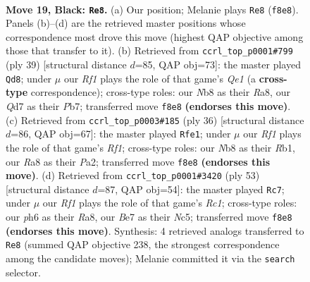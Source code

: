 \documentclass[11pt]{article}
\begin{document}
\begin{figure}[p]
\label{fig:thought-m35}
\end{figure}

\clearpage

\begin{figure}[p]\centering
\begin{subfigure}{0.46\textwidth}\centering
\resizebox{\linewidth}{!}{%
\newchessgame
\chessboard[
  setfen={rnb2rk1/p2qb2p/1pp3pP/3p1pP1/P2P1P2/1P2P1N1/8/R2QKBNR b KQ - 8 19},
  showmover=false,
  pgfstyle=straightmove, color=movearrow, markmove={f8-e8}
]}
\caption{}
\end{subfigure}\hfill
\begin{subfigure}{0.46\textwidth}\centering
\resizebox{\linewidth}{!}{%
\newchessgame
\chessboard[
  setfen={r3q1k1/1p2rpp1/2p1bn1p/4Np1P/p2P1P2/P1QBP3/1P4P1/K1R4R b - - 0 20},
  showmover=false,
  pgfstyle=straightmove, color=movearrow, markmove={e8-d8}
]}
\caption{}
\end{subfigure}
\\[4pt]
\begin{subfigure}{0.46\textwidth}\centering
\resizebox{\linewidth}{!}{%
\newchessgame
\chessboard[
  setfen={2k1rb1r/1p1q1pp1/p4n2/2pP1P2/3p3p/1P1B1Q1P/P1PP1NP1/1R3RK1 w - - 1 19},
  showmover=false,
  pgfstyle=straightmove, color=movearrow, markmove={f1-e1}
]}
\caption{}
\end{subfigure}\hfill
\begin{subfigure}{0.46\textwidth}\centering
\resizebox{\linewidth}{!}{%
\newchessgame
\chessboard[
  setfen={r1r3k1/1p1b1ppp/1q2p3/p1npP1PP/P2N1P2/2P1R3/1PB1Q3/R3K3 b Q - 0 27},
  showmover=false,
  pgfstyle=straightmove, color=movearrow, markmove={c8-c7}
]}
\caption{}
\end{subfigure}
\caption{\textbf{Move 19, Black: \texttt{Re8}.} (a) Our position; Melanie plays \texttt{Re8} (\texttt{f8e8}). Panels (b)--(d) are the retrieved master positions whose correspondence most drove this move (highest QAP objective among those that transfer to it). (b) Retrieved from \texttt{ccrl\_top\_p0001\#799} (ply 39) [structural distance $d$=85, QAP obj=73]: the master played \texttt{Qd8}; under $\mu$ our \emph{Rf1} plays the role of that game's \emph{Qe1} (a \textbf{cross-type} correspondence); cross-type roles: our \emph{N}b8 as their \emph{R}a8, our \emph{Q}d7 as their \emph{P}b7; transferred move \texttt{f8e8} \textbf{(endorses this move)}. (c) Retrieved from \texttt{ccrl\_top\_p0003\#185} (ply 36) [structural distance $d$=86, QAP obj=67]: the master played \texttt{Rfe1}; under $\mu$ our \emph{Rf1} plays the role of that game's \emph{Rf1}; cross-type roles: our \emph{N}b8 as their \emph{R}b1, our \emph{R}a8 as their \emph{P}a2; transferred move \texttt{f8e8} \textbf{(endorses this move)}. (d) Retrieved from \texttt{ccrl\_top\_p0001\#3420} (ply 53) [structural distance $d$=87, QAP obj=54]: the master played \texttt{Rc7}; under $\mu$ our \emph{Rf1} plays the role of that game's \emph{Rc1}; cross-type roles: our \emph{p}h6 as their \emph{R}a8, our \emph{B}e7 as their \emph{N}c5; transferred move \texttt{f8e8} \textbf{(endorses this move)}. Synthesis: 4 retrieved analogs transferred to \texttt{Re8} (summed QAP objective 238, the strongest correspondence among the candidate moves); Melanie committed it via the \texttt{search} selector.}

\end{figure}
\end{document}
